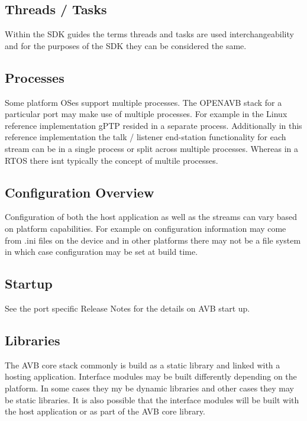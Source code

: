 \subsection*{Threads / Tasks}

Within the S\+DK guides the terms threads and tasks are used interchangeability and for the purposes of the S\+DK they can be considered the same.

\subsection*{Processes}

Some platform O\+Ses support multiple processes. The O\+P\+E\+N\+A\+VB stack for a particular port may make use of multiple processes. For example in the Linux reference implementation g\+P\+TP resided in a separate process. Additionally in this reference implementation the talk / listener end-\/station functionality for each stream can be in a single process or split across multiple processes. Whereas in a R\+T\+OS there isn\textquotesingle{}t typically the concept of multile processes.

\subsection*{Configuration Overview}

Configuration of both the host application as well as the streams can vary based on platform capabilities. For example on configuration information may come from .ini files on the device and in other platforms there may not be a file system in which case configuration may be set at build time.

\subsection*{Startup}

See the port specific Release Notes for the details on A\+VB start up.

\subsection*{Libraries}

The A\+VB core stack commonly is build as a static library and linked with a hosting application. Interface modules may be built differently depending on the platform. In some cases they my be dynamic libraries and other cases they may be static libraries. It is also possible that the interface modules will be built with the host application or as part of the A\+VB core library. 